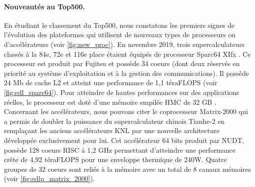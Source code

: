         \paragraph{Nouveautés au Top500.} En étudiant le classement du Top500, nous constatons les premiers signes de l'évolution des plateformes qui utilisent de nouveaux types de processeurs ou d'accélérateurs (voir \autoref{fig:new_proc}). En novembre 2019, trois supercalculateurs classés à la 84e, 72e et 116e place étaient équipés de processeur Sparc64 XIfx \cite{Yoshida2018}. Ce processeur est produit par Fujitsu et possède 34 coeurs (dont deux réservés en priorité au système d'exploitation et à la gestion des communications). Il possède 24 Mb de cache L2 et atteint une performance de 1,1 téraFLOPS (voir \autoref{fig:edl_sparc64}). Pour atteindre de hautes performances sur des applications réelles, le processeur est doté d'une mémoire empilée HMC de 32 GB \cite{Garg2017}. Concernant les accélérateurs, nous pouvons citer le coprocesseur Matrix-2000 qui a permis de doubler la puissance du supercalculateur chinois Tianhe-2 en remplaçant les anciens accélérateurs KNL par une nouvelle architecture développée exclusivement pour lui. Cet accélérateur 64 bits produit par NUDT, possède 128 coeurs RISC à 1,2 GHz permettant d'atteindre une performance crête de 4,92 téraFLOPS pour une enveloppe thermique de 240W. Quatre groupes de 32 coeurs sont reliés à la mémoire avec un total de 8 canaux mémoires (voir \autoref{fig:edlp_matrix_2000}). 
        

